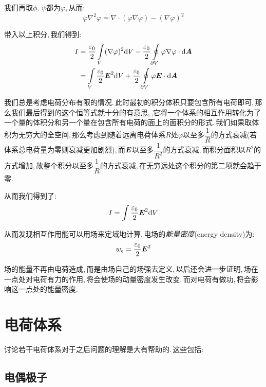 我们再取$\phi,\,\psi$都为$\varphi$,\,从而:
\[\varphi\nabla^2\varphi=\nabla\cdot(\varphi\nabla\varphi)-(\nabla \varphi)^2\]

带入以上积分,\,我们得到:
\begin{align*}
I 	&=\frac{\varepsilon_0}{2}\int\limits_V (\nabla \varphi)^2\textrm{d} V-\frac{\varepsilon_0}{2}\oint\limits_{\partial V} \varphi\nabla\varphi\cdot\textrm{d} \boldsymbol{A}\\
	&=\int\limits_V \frac{\varepsilon_0}{2} \boldsymbol{E}^2 \textrm{d} V + \frac{\varepsilon_0}{2}\oint\limits_{\partial V} \varphi\boldsymbol{E}\cdot\textrm{d} \boldsymbol{A}
\end{align*}

我们总是考虑电荷分布有限的情况.\,此时最初的积分体积只要包含所有电荷即可,\,那么我们最后得到的这个恒等式就十分的有意思,\,,它将一个体系的相互作用转化为了一个量的体积分和另一个量在包含所有电荷的面上的面积分的形式.\,我们如果取体积为无穷大的全空间,\,那么考虑到随着远离电荷体系$R$处$\varphi$以至多$\dfrac{1}{R}$的方式衰减(若体系总电荷量为零则衰减更加剧烈),\,而$\boldsymbol{E}$以至多$\dfrac{1}{R^2}$的方式衰减,\,而积分面积以$R^2$的方式增加,\,故整个积分以至多$\dfrac{1}{R}$的方式衰减,\,在无穷远处这个积分的第二项就会趋于零.\,

从而我们得到了:
\[I=\int \frac{\varepsilon_0}{2} \boldsymbol{E}^2 \textrm{d} V\]

从而发现相互作用能可以用场来定域地计算.\,电场的\emph{能量密度}(energy density)为:
\[w_e=\frac{\varepsilon_0}{2} \boldsymbol{E}^2\]

场的能量不再由电荷造成,\,而是由场自己的场强去定义,\,以后还会进一步证明,\,场在一点处对电荷有力的作用,\,将会使场的动量密度发生改变,\,而对电荷有做功,\,将会影响这一点处的能量密度.


\section{电荷体系}

讨论若干电荷体系对于之后问题的理解是大有帮助的.\,这些包括:

\subsection{电偶极子}

